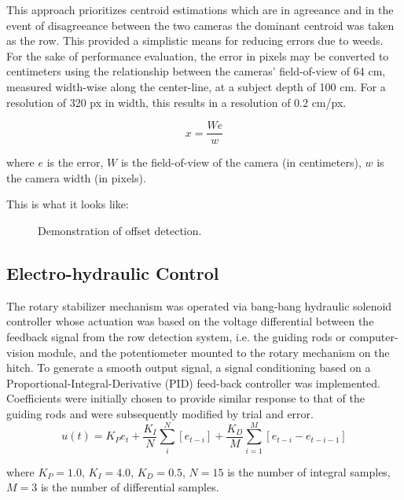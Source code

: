 \documentclass[authoryear]{elsarticle}
\begin{document}
This approach prioritizes centroid estimations which are in agreeance
and in the event of disagreeance between the two cameras the dominant
centroid was taken as the row. This provided a simplistic means for
reducing errors due to weeds. For the sake of performance evaluation,
the error in pixels may be converted to centimeters using the
relationship between the cameras’ field-of-view of 64 cm, measured
width-wise along the center-line, at a subject depth of 100 cm. For a
resolution of 320 px in width, this results in a resolution of 0.2 cm/px.

\begin{equation}
  x = \frac{We}{w}
  \label{eq:px2mm}
\end{equation}
\begin{flushleft}
where $e$ is the error, $W$ is the field-of-view of the camera (in
centimeters), $w$ is the camera width (in pixels).
\end{flushleft}

This is what it looks like:

\begin{figure}
  \centering
  \caption{Demonstration of offset detection.}
  \label{fig:row_estimation}
\end{figure}

\subsection{Electro-hydraulic Control}
The rotary stabilizer mechanism was operated via bang-bang hydraulic
solenoid controller whose actuation was based on the voltage
differential between the feedback signal from the row detection
system, i.e. the guiding rods or computer-vision module, and the
potentiometer mounted to the rotary mechanism on the hitch. 
To generate a smooth output signal, a signal conditioning based on a
Proportional-Integral-Derivative (PID) feed-back controller was
implemented. Coefficients were initially chosen to provide similar
response to that of the guiding rods and were subsequently modified by
trial and error.
\begin{equation}
    u(t) = K_{P}e_{t} + \frac{K_{I}}{N}\displaystyle\sum_i^N \left[
      e_{t-i} \right] +
    \frac{K_{D}}{M}\displaystyle\sum_{i=1}^M \left[e_{t-i}-e_{t-i-1}\right]
  \label{eq:pid}
\end{equation}
\begin{flushleft}
where $K_{P}=1.0$, $K_{I}=4.0$, $K_{D}=0.5$, $N=15$ is the number of integral samples,
$M=3$ is the number of differential samples.
\end{flushleft}
\end{document}
